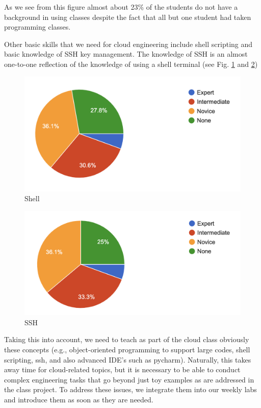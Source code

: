 \documentclass[conference]{IEEEtran}
\begin{document}
As we see from this figure almost about 23\% of the students
do not have a background in using classes despite the fact that all but
one student had taken programming classes.

Other basic skills that we need for cloud engineering include shell
scripting and basic knowledge of SSH key management. The knowledge of
SSH is an almost one-to-one reflection of the knowledge of using a
shell terminal (see Fig. \ref{fig:shell} and \ref{fig:ssh})

\begin{figure}[htb]
  \caption{Shell}\label{fig:shell}
  \centering
    \includegraphics[width=0.9\columnwidth]{images/shell-script.png}

\end{figure}

\begin{figure}[htb]
  \caption{SSH}\label{fig:ssh}
  \centering
    \includegraphics[width=0.9\columnwidth]{images/ssh.png}

\end{figure}

Taking this into account, we need to teach as part of the cloud class
obviously these concepts (e.g., object-oriented programming to
support large codes, shell scripting, ssh, and also advanced IDE's
such as pycharm). Naturally, this takes away time for cloud-related
topics, but it is necessary to be able to conduct complex engineering
tasks that go beyond just toy examples as are addressed in the class
project. To address these issues, we integrate them into our weekly labs
and introduce them as soon as they are needed.
\end{document}
